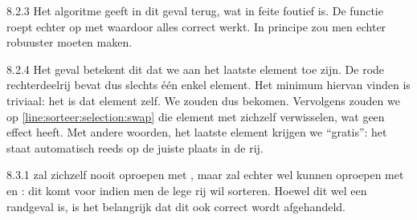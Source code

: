 \begin{Oplossing}{8.2.3}
Het algoritme geeft in dit geval  terug, wat in feite foutief is.
De functie  roept echter 
op met  waardoor alles correct werkt. In principe zou
men echter  robuuster moeten maken.
\end{Oplossing}
\begin{Oplossing}{8.2.4}
Het geval  betekent dit dat we aan het laatste
element toe zijn. De rode rechterdeelrij bevat dus slechts \'e\'en enkel element.
Het minimum hiervan vinden is triviaal: het is dat element zelf.
We zouden dus  bekomen. Vervolgens zouden we
op \cref{line:sorteer:selection:swap} die element met zichzelf verwisselen,
wat geen effect heeft. Met andere woorden, het laatste element krijgen we ``gratis'':
het staat automatisch reeds op de juiste plaats in de rij.
\end{Oplossing}
\begin{Oplossing}{8.3.1}
 zal zichzelf nooit oproepen met ,
maar  zal echter wel  kunnen oproepen
met  en : dit komt voor indien
men de lege rij wil sorteren. Hoewel dit wel een randgeval is, is het belangrijk
dat dit ook correct wordt afgehandeld.
\end{Oplossing}
